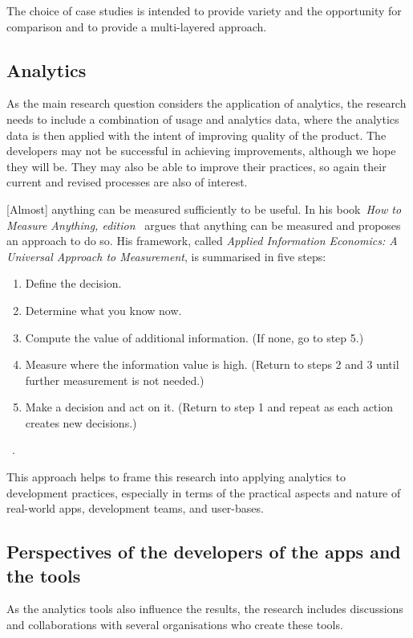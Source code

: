 
The choice of case studies is intended to provide variety and the opportunity for comparison and to provide a multi-layered approach.


\subsection{Analytics}
As the main research question considers the application of analytics, the research needs to include a combination of usage and analytics data, where the analytics data is then applied with the intent of improving quality of the product. The developers may not be successful in achieving improvements, although we hope they will be. They may also be able to improve their practices, so again their current and revised processes are also of interest.

[Almost] anything can be measured sufficiently to be useful. In his book~\emph{How to Measure Anything,  edition}~\citet{hubbard2014measure} argues that anything can be measured and proposes an approach to do so. His framework, called \emph{Applied Information Economics: A Universal Approach to Measurement}, is summarised in five steps:

\begin{enumerate}
    \itemsep0em
    \item Define the decision.
    \item Determine what you know now.
    \item Compute the value of additional information. (If none, go to step 5.)
    \item Measure where the information value is high. (Return to steps 2 and 3 until further measurement is not needed.)
    \item Make a decision and act on it. (Return to step 1 and repeat as each action creates new decisions.)
\end{enumerate} ~\cite[p.9]{hubbard2014measure}.

This approach helps to frame this research into applying analytics to development practices, especially in terms of the practical aspects and nature of real-world apps, development teams, and user-bases.


\subsection{Perspectives of the developers of the apps and the tools}
As the analytics tools also influence the results, the research includes discussions and collaborations with several organisations who create these tools.


